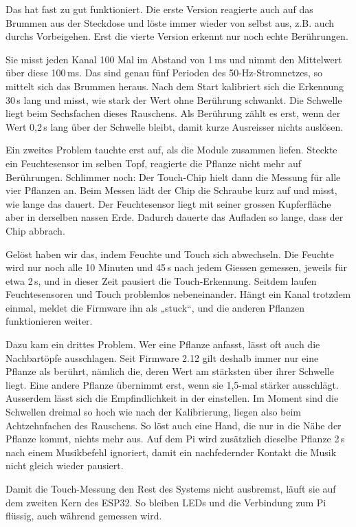 \documentclass[11pt,a4paper]{article}
\begin{document}
Das hat fast zu gut funktioniert. Die erste Version reagierte auch auf das Brummen aus der Steckdose und löste immer wieder von selbst aus, z.B. auch durchs Vorbeigehen. Erst die vierte Version erkennt nur noch echte Berührungen.

Sie misst jeden Kanal 100 Mal im Abstand von 1\,ms und nimmt den Mittelwert über diese 100\,ms. Das sind genau fünf Perioden des 50-Hz-Stromnetzes, so mittelt sich das Brummen heraus. Nach dem Start kalibriert sich die Erkennung 30\,s lang und misst, wie stark der Wert ohne Berührung schwankt. Die Schwelle liegt beim Sechsfachen dieses Rauschens. Als Berührung zählt es erst, wenn der Wert 0,2\,s lang über der Schwelle bleibt, damit kurze Ausreisser nichts auslösen.

Ein zweites Problem tauchte erst auf, als die Module zusammen liefen. Steckte ein Feuchtesensor im selben Topf, reagierte die Pflanze nicht mehr auf Berührungen. Schlimmer noch: Der Touch-Chip hielt dann die Messung für alle vier Pflanzen an. Beim Messen lädt der Chip die Schraube kurz auf und misst, wie lange das dauert. Der Feuchtesensor liegt mit seiner grossen Kupferfläche aber in derselben nassen Erde. Dadurch dauerte das Aufladen so lange, dass der Chip abbrach.

Gelöst haben wir das, indem Feuchte und Touch sich abwechseln. Die Feuchte wird nur noch alle 10 Minuten und 45\,s nach jedem Giessen gemessen, jeweils für etwa 2\,s, und in dieser Zeit pausiert die Touch-Erkennung. Seitdem laufen Feuchtesensoren und Touch problemlos nebeneinander. Hängt ein Kanal trotzdem einmal, meldet die Firmware ihn als „stuck“, und die anderen Pflanzen funktionieren weiter.

Dazu kam ein drittes Problem. Wer eine Pflanze anfasst, lässt oft auch die Nachbartöpfe ausschlagen. Seit Firmware 2.12 gilt deshalb immer nur eine Pflanze als berührt, nämlich die, deren Wert am stärksten über ihrer Schwelle liegt. Eine andere Pflanze übernimmt erst, wenn sie 1,5-mal stärker ausschlägt. Ausserdem lässt sich die Empfindlichkeit in der  einstellen. Im Moment sind die Schwellen dreimal so hoch wie nach der Kalibrierung, liegen also beim Achtzehnfachen des Rauschens. So löst auch eine Hand, die nur in die Nähe der Pflanze kommt, nichts mehr aus. Auf dem Pi wird zusätzlich dieselbe Pflanze 2\,s nach einem Musikbefehl ignoriert, damit ein nachfedernder Kontakt die Musik nicht gleich wieder pausiert.

Damit die Touch-Messung den Rest des Systems nicht ausbremst, läuft sie auf dem zweiten Kern des ESP32. So bleiben LEDs und die Verbindung zum Pi flüssig, auch während gemessen wird.
\end{document}
